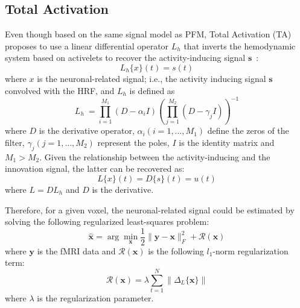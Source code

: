 
\subsection{Total Activation}

Even though based on the same signal model as PFM, Total Activation (TA) proposes to use a linear differential operator \(L_h\) that inverts the hemodynamic system based on activelets to recover the activity-inducing signal \(\mathbf{s}\)~\cite{khalidov2011activelets,karahanouglu2013total}:
\begin{equation}
    L_h\{x\}(t) = s(t)
\end{equation}
where \(x\) is the neuronal-related signal; i.e., the activity inducing signal \(\mathbf{s}\) convolved with the HRF, and \(L_h\) is defined as
\begin{equation}
    L_h\ = \prod_{i=1}^{M_1} (D-\alpha_i I) (\prod_{j=1}^{M_2} (D - \gamma_j I))^{-1}
\end{equation}
where \(D\) is the derivative operator, \(\alpha_i (i=1, \hdots, M_1)\) define the zeros of the filter, \(\gamma_j (j=1, \hdots, M_2)\) represent the poles, \(I\) is the identity matrix and \(M_1 > M_2\). Given the relationship between the activity-inducing and the innovation signal, the latter can be recovered as:
\begin{equation}
    L\{x\}(t) = D\{s\}(t) = u(t)
\end{equation}
where \(L = DL_h\) and \(D\) is the derivative.

Therefore, for a given voxel, the neuronal-related signal could be estimated by solving the following regularized least-squares problem:
\begin{equation}
    \hat{\mathbf{x}} = \arg \min_{\mathbf{x}} \frac{1}{2} \| \mathbf{y} - \mathbf{x} \|_F^2 + \mathcal{R}(\mathbf{x})
\end{equation}
where \(\mathbf{y}\) is the fMRI data and \(\mathcal{R}(\mathbf{x})\) is the following \(l_1\)-norm regularization term:
\begin{equation}
    \mathcal{R}(\mathbf{x}) = \lambda \sum_{t=1}^N \| \Delta_L \{\mathbf{x}\} \|
\end{equation}
where \(\lambda\) is the regularization parameter.
